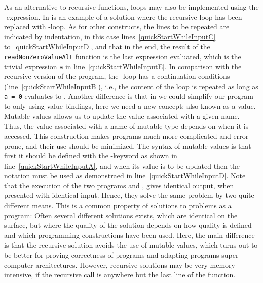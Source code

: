 \documentclass[springer.tex]{subfiles}
\begin{document}
As an alternative to recursive functions, loops may also be implemented using the -expression. In  is an example of a solution where the recursive loop has been replaced with -loop.
% 
%
As for other constructs, the lines to be repeated are indicated by indentation, in this case lines~\ref{quickStartWhileInputC} to~\ref{quickStartWhileInputD}, and that in the end, the result of the
\lstinline{readNonZeroValueAlt} function is the last expression evaluated, which is the trivial expression \lstinline{a} in line~\ref{quickStartWhileInputE}. In comparison with the recursive version of the program, the -loop has a continuation conditions (line~\ref{quickStartWhileInputB}), i.e., the content of the loop is repeated as long as \lstinline{a = 0} evaluates to . Another difference is that in  we could simplify our program to only using  value-bindings, here we need a new concept:  also known as a  value. Mutable values allows us to update the value associated with a given name. Thus, the value associated with a name of mutable type depends on when it is accessed. This construction makes programs much more complicated and error-prone, and their use should be minimized. The syntax of mutable values is that first it should be defined with the -keyword as shown in line~\ref{quickStartWhileInputA}, and when its value is to be updated then the \lexeme{<-}-notation must be used as demonstraed in line~\ref{quickStartWhileInputD}. Note that the execution of the two programs  and , gives identical output, when presented with identical input. Hence, they solve the same problem by two quite different means. This is a common property of solutions to problems as a program: Often several different solutions exists, which are identical on the surface, but where the quality of the solution depends on how quality is defined and which programming constructions have been used. Here, the main difference is that the recursive solution avoids the use of mutable values, which turns out to be better for proving correctness of programs and adapting programs super-computer architectures. However, recursive solutions may be very memory intensive, if the recursive call is anywhere but the last line of the function. 
\end{document}
